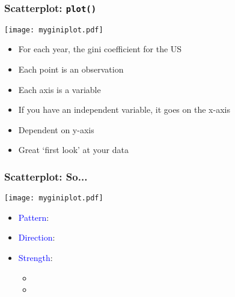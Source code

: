 \documentclass{beamer}
\newcommand{\blue}{\textcolor{blue}}
\begin{document}
\begin{frame}
 \frametitle<+->{Scatterplot: {\tt plot()}}
 \begin{minipage}{.48\linewidth}
 \texttt{[image: myginiplot.pdf]}
 \end{minipage}\hfill
 \begin{minipage}{.48\linewidth}
 \begin{itemize}[<+->]
   \item For each year, the gini coefficient for the US
   \item Each point is an observation
   \item Each axis is a variable
   \item If you have an independent variable, it goes on the x-axis
   \item Dependent on y-axis
   \item Great `first look' at your data
 \end{itemize}
 \end{minipage}
\end{frame}

\begin{frame}
 \frametitle<+->{Scatterplot: So...}
 \begin{minipage}{.48\linewidth}
 \texttt{[image: myginiplot.pdf]}
 \end{minipage}\hfill
 \begin{minipage}{.48\linewidth}
 \begin{itemize}
   \item \blue{Pattern}: 
   \item \blue{Direction}: 
   \item \blue{Strength}: 
     \begin{itemize}
       \item {}
       \item {}
     \end{itemize}
 \end{itemize}
 \end{minipage}
\end{frame}
\end{document}
